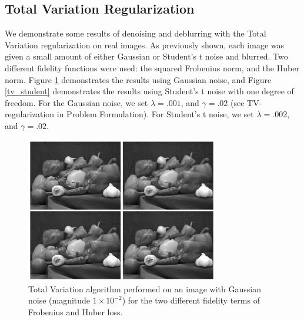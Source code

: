 \documentclass[10pt,a4paper]{article}
\begin{document}
	\subsection{Total Variation Regularization}
	
	We demonstrate some results of denoising and deblurring with the Total Variation regularization on real images. As previously shown, each image was given a small amount of either Gaussian or Student's t noise and blurred. Two different fidelity functions were used: the squared Frobenius norm, and the Huber norm. Figure \ref{tv_gauss} demonstrates the results using Gaussian noise, and Figure \ref{tv_student} demonstrates the results using Student's t noise with one degree of freedom. For the Gaussian noise, we set $\lambda = .001$, and $\gamma = .02$ (see TV-regularization in Problem Formulation). For Student's t noise, we set $\lambda = .002$, and $\gamma = .02$.
	
	\begin{figure}[H]
		\begin{center}
			\includegraphics[width = 0.75\textwidth]{../figures/gaussian_peppers.png} 
		\end{center}
		\caption{Total Variation algorithm performed on an image with Gaussian noise (magnitude $1 \times 10^{-2}$) for the two different fidelity terms of Frobenius and Huber loss.}
		\label{tv_gauss}
	\end{figure}
	
\end{document}
